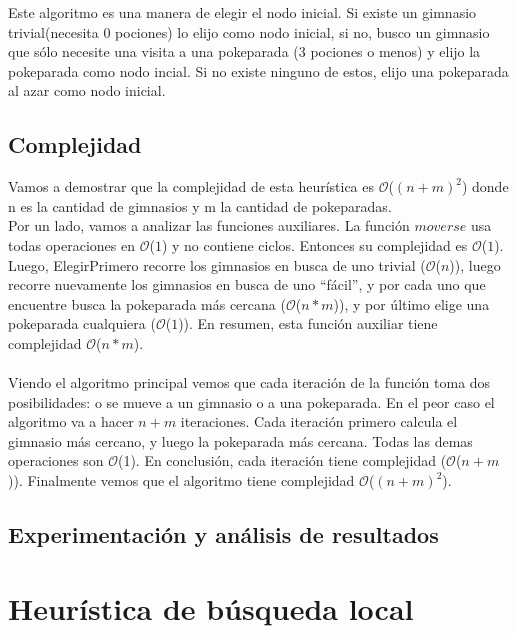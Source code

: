 \documentclass[spanish,12pt]{article}
\begin{document}
Este algoritmo es una manera de elegir el nodo inicial. Si existe un gimnasio trivial(necesita 0 pociones) lo elijo como nodo inicial, si no, busco un gimnasio que sólo necesite una visita a una pokeparada (3 pociones o menos) y elijo la pokeparada como nodo incial. Si no existe ninguno de estos, elijo una pokeparada al azar como nodo inicial.


\subsection{Complejidad}
Vamos a demostrar que la complejidad de esta heurística es $\mathcal{O}$($(n+m)^2$) donde n es la cantidad de gimnasios y m la cantidad de pokeparadas.\\
Por un lado, vamos a analizar las funciones auxiliares. La función $moverse$ usa todas operaciones en $\mathcal{O}$($1$) y no contiene ciclos. Entonces su complejidad es $\mathcal{O}$($1$).\\
Luego, ElegirPrimero recorre los gimnasios en busca de uno trivial ($\mathcal{O}$($n$)), luego recorre nuevamente los gimnasios en busca de uno ``fácil'', y por cada uno que encuentre busca la pokeparada más cercana ($\mathcal{O}$($n*m$)), y por último elige una pokeparada cualquiera ($\mathcal{O}$($1$)). En resumen, esta función auxiliar tiene complejidad $\mathcal{O}$($n*m$).\\
\\
Viendo el algoritmo principal vemos que cada iteración de la función toma dos posibilidades: o se mueve a un gimnasio o a una pokeparada. En el peor caso el algoritmo va a hacer $n+m$ iteraciones. Cada iteración primero calcula el gimnasio más cercano, y luego la pokeparada más cercana. Todas las demas operaciones son $\mathcal{O}$(1). En conclusión, cada iteración tiene complejidad  ($\mathcal{O}$($n+m$)).
Finalmente vemos que el algoritmo tiene complejidad $\mathcal{O}$($(n+m)^2$).


\subsection{Experimentación y análisis de resultados}




\section{Heurística de búsqueda local}
\end{document}
